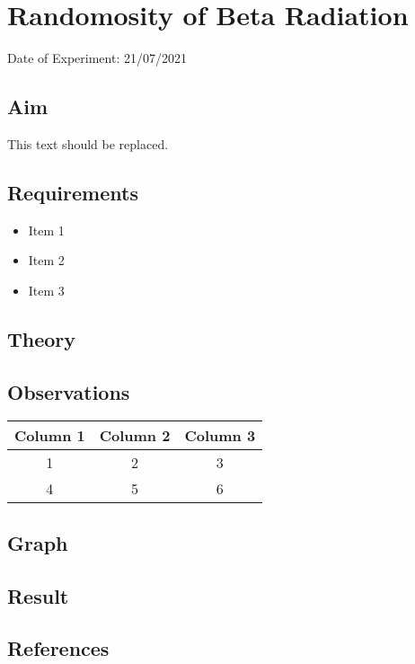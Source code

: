 
{}
\chapter{Randomosity of Beta Radiation}
\vspace{-1cm}
%
\begin{center}%
	Date of Experiment: 21/07/2021
\end{center}
\section{Aim}
This text should be replaced.

\section{Requirements}
\begin{itemize}
	\item 	Item 1
	\item 	Item 2
	\item  	Item 3
\end{itemize}

\section{Theory}
\lipsum[1-3]

\section{Observations}

\begin{center}
	\begin{tabular}{ccc}
		\toprule
		Column 1& Column 2& Column 3\\
		\hline
		1&2&3\\
		4&5&6\\
		\bottomrule
	\end{tabular}
\end{center}

\section{Graph}



\section{Result}

\section{References}


